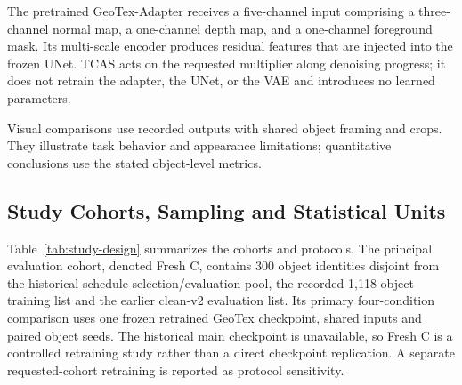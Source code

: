 \documentclass[times,twocolumn,final]{elsarticle}
\begin{document}
The pretrained GeoTex-Adapter receives a five-channel input comprising a three-channel normal map, a one-channel depth map, and a one-channel foreground mask. Its multi-scale encoder produces residual features that are injected into the frozen UNet. TCAS acts on the requested multiplier along denoising progress; it does not retrain the adapter, the UNet, or the VAE and introduces no learned parameters.

Visual comparisons use recorded outputs with shared object framing and crops. They illustrate task behavior and appearance limitations; quantitative conclusions use the stated object-level metrics.

\subsection{Study Cohorts, Sampling and Statistical Units}
\label{subsec:setup}

Table~\ref{tab:study-design} summarizes the cohorts and protocols. The principal evaluation cohort, denoted Fresh C, contains 300 object identities disjoint from the historical schedule-selection/evaluation pool, the recorded 1,118-object training list and the earlier clean-v2 evaluation list. Its primary four-condition comparison uses one frozen retrained GeoTex checkpoint, shared inputs and paired object seeds. The historical main checkpoint is unavailable, so Fresh C is a controlled retraining study rather than a direct checkpoint replication. A separate requested-cohort retraining is reported as protocol sensitivity.
\end{document}
